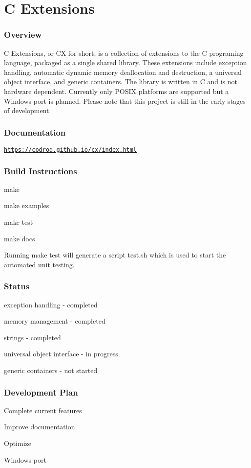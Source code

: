 \section*{C Extensions}

\subsubsection*{Overview}

C Extensions, or CX for short, is a collection of extensions to the C programing language, packaged as a single shared library. These extensions include exception handling, automatic dynamic memory deallocation and destruction, a universal object interface, and generic containers. The library is written in C and is not hardware dependent. Currently only P\+O\+S\+IX platforms are supported but a Windows port is planned. Please note that this project is still in the early stages of development. \subsubsection*{Documentation}

\href{https://codrod.github.io/cx/index.html}{\tt https\+://codrod.\+github.\+io/cx/index.\+html} \subsubsection*{Build Instructions}


\begin{DoxyItemize}
\item make 
\item make examples 
\item make test 
\item make docs 
\end{DoxyItemize}

Running \textquotesingle{}make test\textquotesingle{} will generate a script \textquotesingle{}test.\+sh\textquotesingle{} which is used to start the automated unit testing. 

\subsubsection*{Status}


\begin{DoxyItemize}
\item exception handling -\/ completed 
\item memory management -\/ completed 
\item strings -\/ completed 
\item universal object interface -\/ in progress 
\item generic containers -\/ not started 
\end{DoxyItemize}\subsubsection*{Development Plan}


\begin{DoxyEnumerate}
\item Complete current features 
\item Improve documentation 
\item Optimize 
\item Windows port 
\end{DoxyEnumerate}
